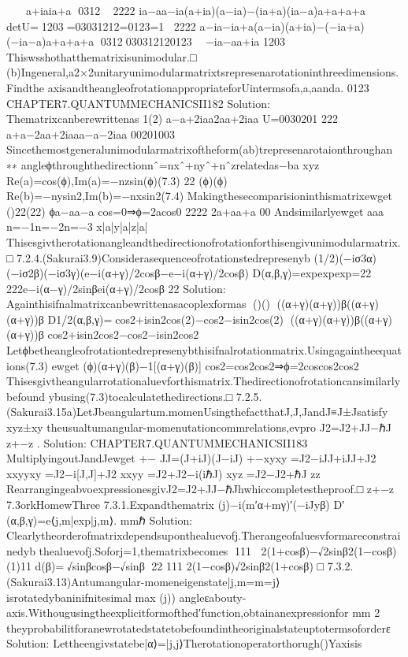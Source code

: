 {{{{{{{{{{

a+iaia+a
0312
2222
ia−aa−ia(a+ia)(a−ia)−(ia+a)(ia−a)a+a+a+a
detU=1203=03031212=0123=1
2222
a−ia−ia+a(a−ia)(a+ia)−(−ia+a)(−ia−a)a+a+a+a
0312030312120123

−ia−aa+ia
1203
Thiswsshothatthematrixisunimodular.□
(b)Ingeneral,a2×2unitaryunimodularmatrixtsrepresenarotationinthreedimensions.Findthe
axisandtheangleofrotationappropriateforUintermsofa,a,aanda.
0123
CHAPTER7.QUANTUMMECHANICSII182
Solution:
Thematrixcanberewrittenas
1(2)
a−a+2iaa2aa+2iaa
U=0030201
222
a+a−2aa+2iaaa−a−2iaa
00201003
Sincethemostgeneralunimodularmatrixoftheform(ab)trepresenarotaionthroughan
∗∗
angleϕthroughthedirectionnˆ=nxˆ+nyˆ+nˆzrelatedas−ba
xyz
Re(a)=cos(ϕ),Im(a)=−nzsin(ϕ)(7.3)
22
(ϕ)(ϕ)
Re(b)=−nysin2,Im(b)=−nxsin2(7.4)
Makingthesecomparisioninthismatrixewget
()22(22)
ϕa−aa−a
cos=0⇒ϕ=2acos0
2222
2a+aa+a
00
Andsimilarlyewget
aaa
n=−1n=−2n=−3
x|a|y|a|z|a|
Thisesgivtherotationangleandthedirectionofrotationforthisengivunimodularmatrix.□
7.2.4.(Sakurai3.9)Considerasequenceofrotationstedrepresenyb
(1/2)(−iσ3α)(−iσ2β)(−iσ3γ)(e−i(α+γ)/2cosβ−e−i(α+γ)/2cosβ)
D(α,β,γ)=expexpexp=22
222e−i(α−γ)/2sinβei(α+γ)/2cosβ
22
Solution:
Againthisifnalmatrixcanbewrittenasacoplexformas
()()
((α+γ)(α+γ))β((α+γ)(α+γ))β
D1/2(α,β,γ)=cos2+isin2cos(2)−cos2−isin2cos(2)
((α+γ)(α+γ))β((α+γ)(α+γ))β
cos2+isin2cos2−cos2−isin2cos2
Letϕbetheangleofrotationtedrepresenybthisifnalrotationmatrix.Usingagaintheequations(7.3)
ewget
(ϕ)(α+γ)(β)−1[(α+γ)(β)]
cos2=cos2cos2⇒ϕ=2coscos2cos2
Thisesgivtheangularrotationaluevforthismatrix.Thedirectionofrotationcansimilarlybefound
ybusing(7.3)tocalculatethedirections.□
7.2.5.(Sakurai3.15a)LetJbeangulartum.momenUsingthefactthatJ,J,JandJ≡J±Jsatisfy
xyz±xy
theusualtumangular-momenutationcommrelations,evpro
J2=J2+JJ−ℏJ
z+−z
.
Solution:
CHAPTER7.QUANTUMMECHANICSII183
MultiplyingoutJandJewget
+−
JJ=(J+iJ)(J−iJ)
+−xyxy
=J2−iJJ+iJJ+J2
xxyyxy
=J2−i[J,J]+J2
xxyy
=J2+J2−i(iℏJ)
xyz
=J2−J2+ℏJ
zz
RearrangingeabvoexpressionesgivJ2=J2+JJ−ℏJhwhiccompletestheproof.□
z+−z
7.3orkHomewThree
7.3.1.Expandthematrix
(j)−i(m′α+mγ)′(−iJyβ)
D′(α,β,γ)=e⟨j,m|exp|j,m⟩.
mmℏ
Solution:
Clearlytheorderofmatrixdependsuponthealuevofj.Therangeofaluesvformareconstrainedyb
thealuevofj.Soforj=1,thematrixbecomes
111
2(1+cosβ)−√2sinβ2(1−cosβ)
(1)11
d(β)=√sinβcosβ−√sinβ
22
111
2(1−cosβ)√2sinβ2(1+cosβ)
□
7.3.2.(Sakurai3.13)Antumangular-momeneigenstate|j,m=m=j⟩isrotatedybaninifnitesimal
max
(j))
angleεabouty-axis.Withougusingtheexplicitformofthed′function,obtainanexpressionfor
mm
2
theyprobabilitforanewrotatedstatetobefoundintheoriginalstateuptotermsoforderε
Solution:
Lettheengivstatebe|α⟩=|j,j⟩Therotationoperatorthorugh()Yaxisis
}}}}}}}}}}

